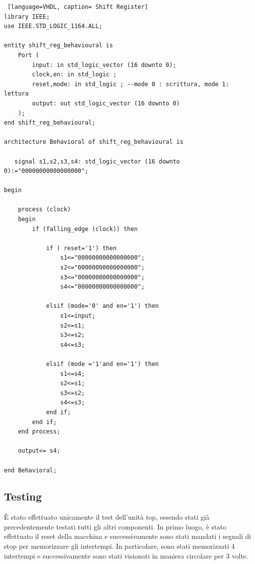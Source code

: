 \begin{lstlisting} [language=VHDL, caption= Shift Register]
library IEEE;
use IEEE.STD_LOGIC_1164.ALL;

entity shift_reg_behavioural is
    Port (
        input: in std_logic_vector (16 downto 0);
        clock,en: in std_logic ;
        reset,mode: in std_logic ; --mode 0 : scrittura, mode 1: lettura
        output: out std_logic_vector (16 downto 0)
    );
end shift_reg_behavioural;

architecture Behavioral of shift_reg_behavioural is

   signal s1,s2,s3,s4: std_logic_vector (16 downto 0):="00000000000000000";

begin

    process (clock)
    begin
        if (falling_edge (clock)) then
        
            if ( reset='1') then
                s1<="00000000000000000";
                s2<="00000000000000000";
                s3<="00000000000000000";
                s4<="00000000000000000";
            
            elsif (mode='0' and en='1') then
                s1<=input;
                s2<=s1;
                s3<=s2;
                s4<=s3;
                
            elsif (mode ='1'and en='1') then
                s1<=s4;
                s2<=s1;
                s3<=s2;
                s4<=s3;
            end if;
        end if;
    end process;

    output<= s4;

end Behavioral;
\end{lstlisting}


\subsection{Testing}
È stato effettuato unicamente il test dell'unità top, essendo stati già precedentemente testati tutti gli altri componenti. In primo luogo, è stato effettuato il reset della macchina e successivamente sono stati mandati i segnali di stop per memorizzare gli intertempi. In particolare, sono stati memorizzati 4 intertempi e successivamente sono stati visionati in maniera circolare per 3 volte.

